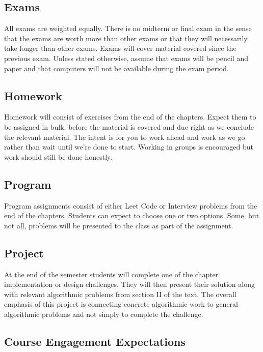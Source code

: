 \documentclass[10pt]{article}
\begin{document}
 \subsection*{Exams}

 All exams are weighted equally. There is no midterm or final exam in the sense that the exams are worth more than other exams or that they will necessarily take longer than other exams.  Exams will cover material covered since the previous exam. Unless stated otherwise, assume that exams will be pencil and paper and that computers will not be available during the exam period.

\subsection*{Homework}

Homework will consist of exercises from the end of the chapters. Expect them to be assigned in bulk, before the material is covered and due right as we conclude the relevant material. The intent is for you to work ahead and work as we go rather than wait until we're done to start. Working in groups is encouraged but work should still be done honestly.

\subsection*{Program}

Program assignments consist of either Leet Code or Interview problems from the end of the chapters. Students can expect to choose one or two options. Some, but not all, problems will be presented to the class as part of the assignment.

\subsection*{Project}

At the end of the semester students will complete one of the chapter implementation or design challenges. They will then present their solution along with relevant algorithmic problems from section II of the text. The overall emphasis of this project is connecting concrete algorithmic work to general algorithmic problems and not simply to complete the challenge.

\subsection{Course Engagement Expectations}
\end{document}
